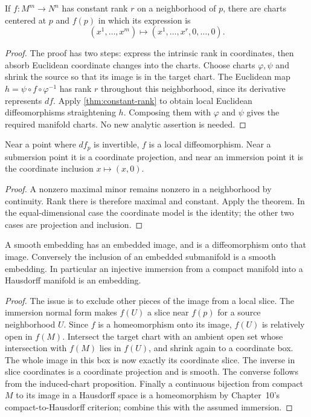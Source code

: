 \begin{theorem}\label{thm:manifold-constant-rank}
If $f:M^m\to N^n$ has constant rank $r$ on a neighborhood of $p$, there
are charts centered at $p$ and $f(p)$ in which its expression is
\[
(x^1,\ldots,x^m)\longmapsto(x^1,\ldots,x^r,0,\ldots,0).
\]
\end{theorem}
\begin{proof}
The proof has two steps: express the intrinsic rank in coordinates, then
absorb Euclidean coordinate changes into the charts. Choose charts
$\varphi,\psi$ and shrink the source so that its image is in the target
chart. The Euclidean map $h=\psi\circ f\circ\varphi^{-1}$ has rank $r$
throughout this neighborhood, since its derivative represents $df$.
Apply \cref{thm:constant-rank} to obtain local Euclidean diffeomorphisms
straightening $h$. Composing them with $\varphi$ and $\psi$ gives the
required manifold charts. No new analytic assertion is needed.
\end{proof}
\begin{corollary}
Near a point where $df_p$ is invertible, $f$ is a local diffeomorphism.
Near a submersion point it is a coordinate projection, and near an immersion
point it is the coordinate inclusion $x\mapsto(x,0)$.
\end{corollary}
\begin{proof}
A nonzero maximal minor remains nonzero in a neighborhood by continuity.
Rank there is therefore maximal and constant. Apply the theorem. In the
equal-dimensional case the coordinate model is the identity; the other
two cases are projection and inclusion.
\end{proof}
\begin{proposition}\label{prop:embedding-image}
A smooth embedding has an embedded image, and is a diffeomorphism onto
that image. Conversely the inclusion of an embedded submanifold is a
smooth embedding. In particular an injective immersion from a compact
manifold into a Hausdorff manifold is an embedding.
\end{proposition}
\begin{proof}
The issue is to exclude other pieces of the image from a local slice.
The immersion normal form makes $f(U)$ a slice near $f(p)$ for a source
neighborhood $U$. Since $f$ is a homeomorphism onto its image, $f(U)$ is
relatively open in $f(M)$. Intersect the target chart with an ambient open
set whose intersection with $f(M)$ lies in $f(U)$, and shrink again to a
coordinate box. The whole image in this box is now exactly its coordinate
slice. The inverse in slice coordinates is a coordinate projection and
is smooth. The converse follows from the induced-chart proposition.
Finally a continuous bijection from compact $M$ to its image in a Hausdorff
space is a homeomorphism by Chapter~10's compact-to-Hausdorff criterion;
combine this with the assumed immersion.
\end{proof}

